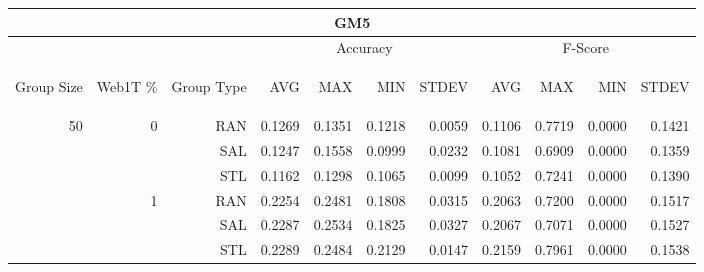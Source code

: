 \begin{center}
\begin{table}[htbp] 
 \begin{center}
\begin{tabular}{ | r | r | r | r | r | r | r | r | r | r | r |}
\hline
\multicolumn{11}{|c|}{GM5}\\
\hline
 & & & \multicolumn{4}{|c|}{Accuracy} & \multicolumn{4}{|c|}{F-Score}\\ \cline{4-11}
\begin{sideways}Group Size\end{sideways} & \begin{sideways}Web1T \%\end{sideways} & \begin{sideways}Group Type\end{sideways} & \begin{sideways}AVG\end{sideways} & \begin{sideways}MAX\end{sideways} & \begin{sideways}MIN\end{sideways} & \begin{sideways}STDEV\end{sideways} & \begin{sideways}AVG\end{sideways} & \begin{sideways}MAX\end{sideways} & \begin{sideways}MIN\end{sideways} & \begin{sideways}STDEV\end{sideways}\\
\hline
\multirow{18}{*}{50}
 & \multirow{3}{*}{0} & RAN & 0.1269 & 0.1351 & 0.1218 & 0.0059 & 0.1106 & 0.7719 & 0.0000 & 0.1421\\ \cline{3-11}
 &   & SAL & 0.1247 & 0.1558 & 0.0999 & 0.0232 & 0.1081 & 0.6909 & 0.0000 & 0.1359\\ \cline{3-11}
 &   & STL & 0.1162 & 0.1298 & 0.1065 & 0.0099 & 0.1052 & 0.7241 & 0.0000 & 0.1390\\ \cline{2-11}
 & \multirow{3}{*}{1} & RAN & 0.2254 & 0.2481 & 0.1808 & 0.0315 & 0.2063 & 0.7200 & 0.0000 & 0.1517\\ \cline{3-11}
 &   & SAL & 0.2287 & 0.2534 & 0.1825 & 0.0327 & 0.2067 & 0.7071 & 0.0000 & 0.1527\\ \cline{3-11}
 &   & STL & 0.2289 & 0.2484 & 0.2129 & 0.0147 & 0.2159 & 0.7961 & 0.0000 & 0.1538\\ \cline{2-11}

\end{tabular}
\end{center}
\end{table}
\end{center}
